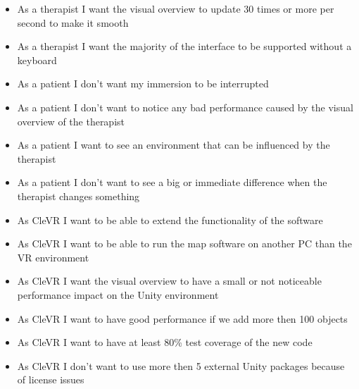 \documentclass[11pt]{article}
\begin{document}
\begin{itemize}
        \item As a therapist I want the visual overview to update 30 times or more per second to make it smooth
        \item As a therapist I want the majority of the interface to be supported without a keyboard
		\item As a patient I don't want my immersion to be interrupted
        \item As a patient I don't want to notice any bad performance caused by the visual overview of the therapist
        \item As a patient I want to see an environment that can be influenced by the therapist
        \item As a patient I don't want to see a big or immediate difference when the therapist changes something
        \item As CleVR I want to be able to extend the functionality of the software
        \item As CleVR I want to be able to run the map software on another PC than the VR environment
        \item As CleVR I want the visual overview to have a small or not noticeable performance impact on the Unity environment
        \item As CleVR I want to have good performance if we add more then 100 objects
        \item As CleVR I want to have at least 80\% test coverage of the new code
        \item As CleVR I don't want to use more then 5 external Unity packages because of license issues
	\end{itemize}
    
\end{document}
